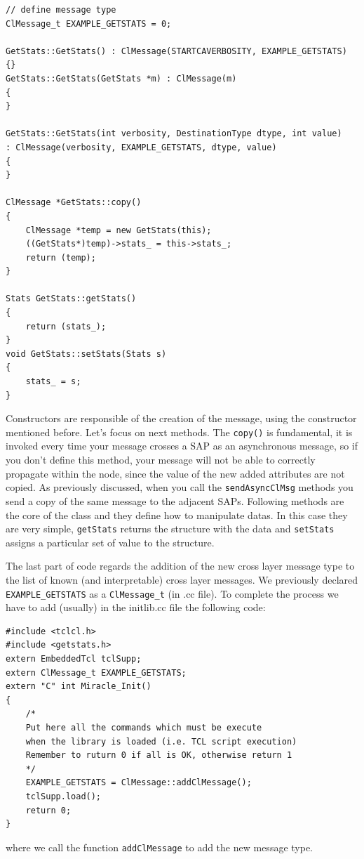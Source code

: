 \documentclass[a4paper,10pt]{article}
\begin{document}
\begin{verbatim}
// define message type
ClMessage_t EXAMPLE_GETSTATS = 0;

GetStats::GetStats() : ClMessage(STARTCAVERBOSITY, EXAMPLE_GETSTATS) {}
GetStats::GetStats(GetStats *m) : ClMessage(m)
{
}

GetStats::GetStats(int verbosity, DestinationType dtype, int value)
: ClMessage(verbosity, EXAMPLE_GETSTATS, dtype, value)
{
}

ClMessage *GetStats::copy()
{
	ClMessage *temp = new GetStats(this);
	((GetStats*)temp)->stats_ = this->stats_;
	return (temp);
}

Stats GetStats::getStats()
{
	return (stats_);
}
void GetStats::setStats(Stats s)
{
	stats_ = s;
}

\end{verbatim}
Constructors are responsible of the creation of the message, using the constructor mentioned before. Let's focus on next methods. The \verb=copy()= is fundamental, it is invoked every time your message crosses a SAP as an asynchronous message, so if you don't define this method, your message will not be able to correctly propagate within the node, since the value of the new added attributes are not copied. As previously discussed, when you call the \verb-sendAsyncClMsg- methods you send a copy of the same message to the adjacent SAPs.
Following methods are the core of the class and they define how to manipulate datas. In this case they are very simple, \verb=getStats= returns the structure with the data and \verb=setStats= assigns a particular set of value to the structure.

The last part of code regards the addition of the new cross layer message type to the list of known (and interpretable) cross layer messages. We previously declared \verb=EXAMPLE_GETSTATS= as a \verb=ClMessage_t= (in .cc file). To complete the process we have to add (usually) in the initlib.cc file the following code:

\begin{verbatim}
#include <tclcl.h>
#include <getstats.h>
extern EmbeddedTcl tclSupp;
extern ClMessage_t EXAMPLE_GETSTATS;
extern "C" int Miracle_Init()
{
	/*
	Put here all the commands which must be execute
	when the library is loaded (i.e. TCL script execution)
	Remember to ruturn 0 if all is OK, otherwise return 1
	*/
	EXAMPLE_GETSTATS = ClMessage::addClMessage();
	tclSupp.load();
	return 0;
}
\end{verbatim}
where we call the function \verb=addClMessage= to add the new message type.
\end{document}
